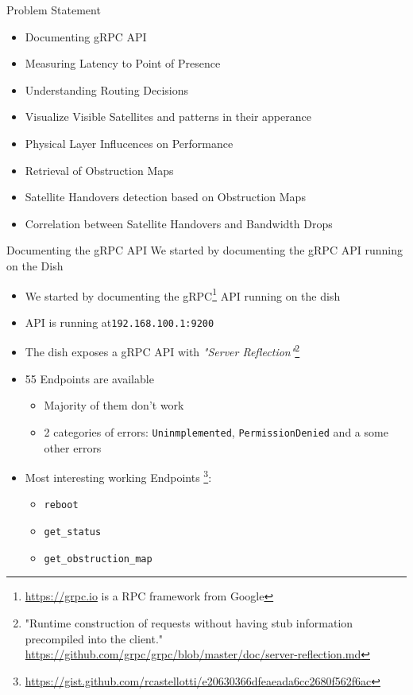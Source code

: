 \documentclass[NET,english,beameralt]{tumbeamer}
\begin{document}
\begin{frame}{Problem Statement}
    \color{red}{should i remove this slide?}
	\begin{itemize}
        \item Documenting gRPC API
        \item Measuring Latency to Point of Presence
		\item Understanding Routing Decisions
		\item Visualize Visible Satellites and patterns in their apperance
		\item Physical Layer Influcences on Performance
		\item Retrieval of Obstruction Maps
		\item Satellite Handovers detection based on Obstruction Maps
		\item Correlation between Satellite Handovers and Bandwidth Drops	
	\end{itemize}
\end{frame}

\begin{frame}{Documenting the gRPC API}
    We started by documenting the gRPC API running on the Dish
    \begin{itemize}
        \item We started by documenting the gRPC\footnote{\url{https://grpc.io} is a RPC framework from Google} API running on the dish
        \item API is running at\texttt{192.168.100.1:9200}
		\item The dish exposes a gRPC API with \emph{"Server Reflection"}\footnote{"Runtime construction of requests without having stub
            information precompiled into the client." \url{https://github.com/grpc/grpc/blob/master/doc/server-reflection.md}}
        \item 55 Endpoints are available
        \begin{itemize}
            \item Majority of them don't work
            \item 2 categories of errors: \texttt{Uninmplemented}, \texttt{PermissionDenied} and a some other errors 
        \end{itemize}
        \item Most interesting working Endpoints \footnote{\url{https://gist.github.com/rcastellotti/e20630366dfeaeada6cc2680f562f6ac}}: 
            \begin{itemize}
                \item \texttt{reboot}
                \item \texttt{get\_status}
                \item \texttt{get\_obstruction\_map}
            \end{itemize}
    \end{itemize}
\end{frame}
\end{document}
